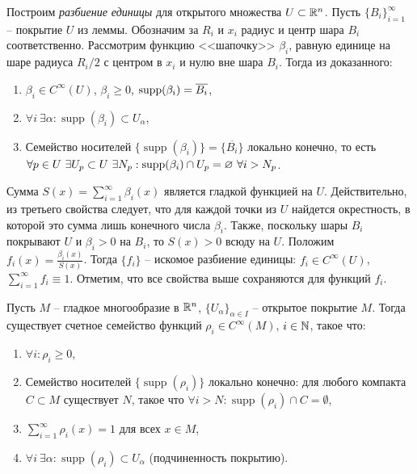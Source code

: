 
\begin{note}
	Построим \textit{разбиение единицы} для открытого множества $U \subset \mathbb{R}^n$. Пусть $\{B_i\}_{i=1}^{\infty}$ -- покрытие $U$ из леммы. Обозначим за $R_i$ и $x_i$ радиус и центр шара $B_i$ соответственно. Рассмотрим функцию <<шапочку>> $\beta_i$, равную единице на шаре радиуса $R_i/2$ с центром в $x_i$ и нулю вне шара $B_i$.
	Тогда из доказанного:
	\begin{enumerate}[itemsep = 0pt, topsep = 5pt]
		\item $\beta_i \in C^{\infty}(U)$, $\beta_i \geq 0$, $\operatorname{supp}(\beta_i) = \overline{B_i}$,
		\item $\forall i \ \exists \alpha : \operatorname{supp}(\beta_i) \subset U_{\alpha}$,
		\item Семейство носителей $\{\operatorname{supp}(\beta_i)\} = \{\overline{B_i}\}$ локально конечно, то есть $\forall p \in U \ \exists U_p \subset U \ \exists N_p : \supp(\beta_i) \cap U_p = \emptyset \ \forall i > N_p$.
	\end{enumerate} 
	Сумма $S(x) = \sum_{i=1}^{\infty} \beta_i(x)$ является гладкой функцией на $U$. Действительно, из третьего свойства следует, что для каждой точки из $U$ найдется окрестность, в которой это сумма лишь конечного числа $\beta_i$.
	Также, поскольку шары $B_i$ покрывают $U$ и $\beta_i > 0$ на $B_i$, то $S(x) > 0$ всюду на $U$.
	Положим $f_i(x) = \frac{\beta_i(x)}{S(x)}$. Тогда $\{f_i\}$ -- искомое разбиение единицы: $f_i \in C^\infty(U)$, $\sum_{i=1}^{\infty} f_i \equiv 1$. 
	Отметим, что все свойства выше сохраняются для функций $f_i$.
\end{note}

\begin{theorem}
	Пусть $M$ -- гладкое многообразие в $\mathbb{R}^n$, $\{U_{\alpha}\}_{\alpha \in I}$ -- открытое покрытие $M$. Тогда существует счетное семейство функций $\rho_i \in C^{\infty}(M)$, $i \in \mathbb{N}$, такое что:
	\begin{enumerate}[itemsep = 0pt, topsep = 5pt]
		\item $\forall i : \rho_i \geq 0$,
		\item Семейство носителей $\{\operatorname{supp}(\rho_i)\}$ локально конечно: для любого компакта $C \subset M$ существует $N$, такое что $\forall i > N : \operatorname{supp}(\rho_i) \cap C = \emptyset$,
		\item $\sum_{i=1}^{\infty} \rho_i(x) = 1$ для всех $x \in M$,
		\item $\forall i \ \exists \alpha : \operatorname{supp}(\rho_i) \subset U_{\alpha}$ (подчиненность покрытию).
	\end{enumerate}
\end{theorem}


